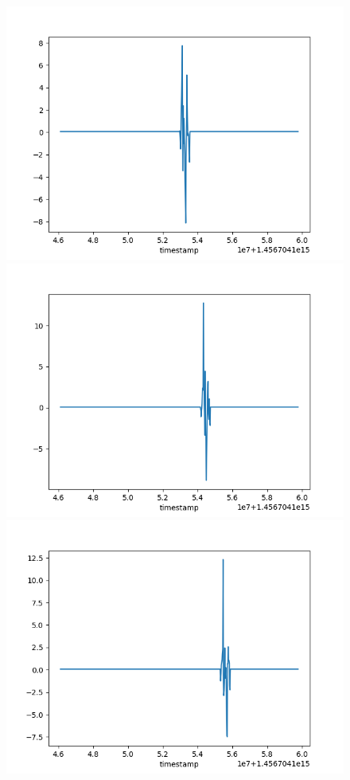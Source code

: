 \documentclass{beamer}
\begin{document}
\begin{frame}
\begin{figure}
	\includegraphics[scale=.15]{point_5}
    \includegraphics[scale=.15]{point_6}
    \includegraphics[scale=.15]{point_7}
\end{figure}



\end{frame}
\end{document}
